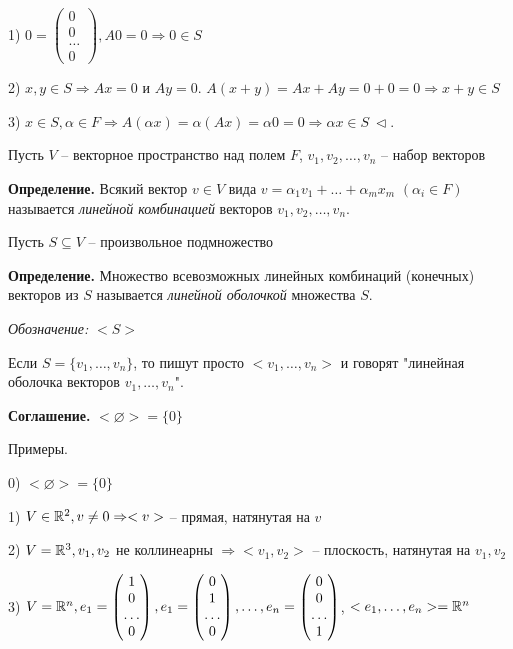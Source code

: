1) $0 = \begin{pmatrix} 0 \\ 0 \\ \dots \\ 0 \end{pmatrix}, A0 = 0 \Rightarrow 0 \in S$

2) $x, y \in S \Rightarrow Ax = 0$ и $Ay = 0$. $A(x+y) = Ax + Ay = 0 + 0 = 0 \Rightarrow x + y \in S$

3) $x \in S, \alpha \in F \Rightarrow A(\alpha x) = \alpha (Ax) = \alpha 0 = 0 \Rightarrow \alpha x \in S \ \lhd$.

\vspace{\baselineskip}
Пусть $V$ -- векторное пространство над полем $F$, $v_1, v_2, \dots, v_n$ --  набор векторов

\vspace{\baselineskip}
\textbf{Определение.} Всякий вектор $v \in V$ вида $v = \alpha_1 v_1 + \dots + \alpha_m x_m$ $(\alpha_i \in F)$ называется \textit{линейной комбинацией} векторов $v_1, v_2, \dots, v_n$.

\vspace{\baselineskip}
Пусть $S \subseteq V$ -- произвольное подмножество

\vspace{\baselineskip}
\textbf{Определение.} Множество всевозможных линейных комбинаций (конечных) векторов из $S$ называется \textit{линейной оболочкой} множества $S$.

\textit{Обозначение:} $<S>$

\vspace{\baselineskip}
Если $S = \{v_1, \dots, v_n\}$, то пишут просто $<v_1, \dots, v_n>$ и говорят "линейная оболочка векторов $v_1, \dots, v_n$".

\vspace{\baselineskip}
\textbf{Соглашение.} $<\varnothing> = \{0\}$

\vspace{\baselineskip}
Примеры.

0) $<\varnothing> = \{0\}$

1) $V \in \mathbb{R}^2, v \neq 0 \Rightarrow <v>$ -- прямая, натянутая на $v$

2) $V = \mathbb{R}^3, v_1, v_2$ не коллинеарны $\Rightarrow <v_1, v_2>$ -- плоскость, натянутая на $v_1, v_2$

3) $V = \mathbb{R}^n, e_1 = \begin{pmatrix} 1 \\ 0 \\ \dots \\ 0 \end{pmatrix}, e_1 = \begin{pmatrix} 0 \\ 1 \\ \dots \\ 0 \end{pmatrix}, \dots, e_n = \begin{pmatrix} 0 \\ 0 \\ \dots \\ 1 \end{pmatrix}$, $<e_1, \dots, e_n> = \mathbb{R}^n$

